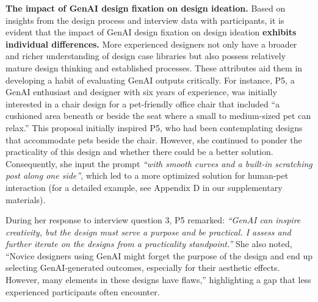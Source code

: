 
\textbf{The impact of GenAI design fixation on design ideation.}
Based on insights from the design process and interview data with participants, it is evident that the impact of GenAI design fixation on design ideation \textbf{exhibits individual differences.} More experienced designers not only have a broader and richer understanding of design case libraries but also possess relatively mature design thinking and established processes. These attributes aid them in developing a habit of evaluating GenAI outputs critically. For instance, P5, a GenAI enthusiast and designer with six years of experience, was initially interested in a chair design for a pet-friendly office chair that included “a cushioned area beneath or beside the seat where a small to medium-sized pet can relax.” This proposal initially inspired P5, who had been contemplating designs that accommodate pets beside the chair. However, she continued to ponder the practicality of this design and whether there could be a better solution. Consequently, she input the prompt \textit{“with smooth curves and a built-in scratching post along one side”}, which led to a more optimized solution for human-pet interaction (for a detailed example, see Appendix D in our supplementary materials).

During her response to interview question 3, P5 remarked: \textit{“GenAI can inspire creativity, but the design must serve a purpose and be practical. I assess and further iterate on the designs from a practicality standpoint.”} She also noted, “Novice designers using GenAI might forget the purpose of the design and end up selecting GenAI-generated outcomes, especially for their aesthetic effects. However, many elements in these designs have flaws,” highlighting a gap that less experienced participants often encounter.
